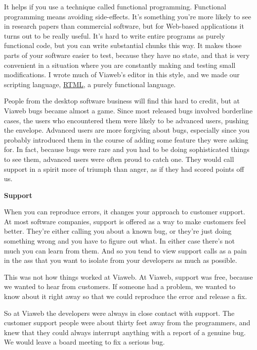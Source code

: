 \documentclass[12pt]{book}
\begin{document}
It helps if you use a technique called functional programming.
Functional programming means avoiding side-effects. It's something
you're more likely to see in research papers than commercial software,
but for Web-based applications it turns out to be really useful. It's
hard to write entire programs as purely functional code, but you can
write substantial chunks this way. It makes those parts of your software
easier to test, because they have no state, and that is very convenient
in a situation where you are constantly making and testing small
modifications. I wrote much of Viaweb's editor in this style, and we
made our scripting language,
\href{http://store.yahoo.com/rtml.html}{RTML}, a purely functional
language.

People from the desktop software business will find this hard to credit,
but at Viaweb bugs became almost a game. Since most released bugs
involved borderline cases, the users who encountered them were likely to
be advanced users, pushing the envelope. Advanced users are more
forgiving about bugs, especially since you probably introduced them in
the course of adding some feature they were asking for. In fact, because
bugs were rare and you had to be doing sophisticated things to see them,
advanced users were often proud to catch one. They would call support in
a spirit more of triumph than anger, as if they had scored points off
us.

\textbf{Support}

When you can reproduce errors, it changes your approach to customer
support. At most software companies, support is offered as a way to make
customers feel better. They're either calling you about a known bug, or
they're just doing something wrong and you have to figure out what. In
either case there's not much you can learn from them. And so you tend to
view support calls as a pain in the ass that you want to isolate from
your developers as much as possible.

This was not how things worked at Viaweb. At Viaweb, support was free,
because we wanted to hear from customers. If someone had a problem, we
wanted to know about it right away so that we could reproduce the error
and release a fix.

So at Viaweb the developers were always in close contact with support.
The customer support people were about thirty feet away from the
programmers, and knew that they could always interrupt anything with a
report of a genuine bug. We would leave a board meeting to fix a serious
bug.
\end{document}
